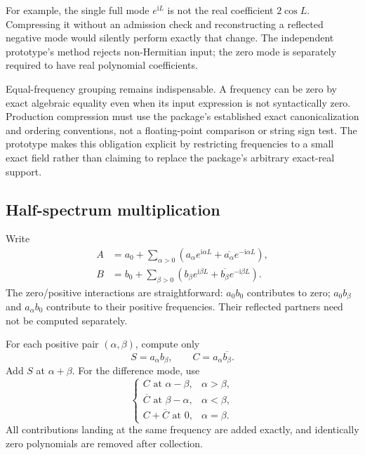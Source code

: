 \documentclass[11pt,letterpaper]{article}
\newcommand{\code}[1]{\texttt{\small\detokenize{#1}}}
\newcommand{\ii}{\mathrm i}
\begin{document}
For example, the single full mode \(e^{\ii L}\) is not the real coefficient \(2\cos L\). Compressing it without an admission check and reconstructing a reflected negative mode would silently perform exactly that change. The independent prototype's \code{from_full} method rejects non-Hermitian input; the zero mode is separately required to have real polynomial coefficients.

Equal-frequency grouping remains indispensable. A frequency can be zero by exact algebraic equality even when its input expression is not syntactically zero. Production compression must use the package's established exact canonicalization and ordering conventions, not a floating-point comparison or string sign test. The prototype makes this obligation explicit by restricting frequencies to a small exact field rather than claiming to replace the package's arbitrary exact-real support.

\subsection{Half-spectrum multiplication}
Write
\begin{align*}
 A &= a_0+\sum_{\alpha>0}
       \left(a_\alpha e^{\ii\alpha L}
       +\overline{a_\alpha}e^{-\ii\alpha L}\right),\\
 B &= b_0+\sum_{\beta>0}
       \left(b_\beta e^{\ii\beta L}
       +\overline{b_\beta}e^{-\ii\beta L}\right).
\end{align*}
The zero/positive interactions are straightforward: \(a_0b_0\) contributes to zero; \(a_0b_\beta\) and \(a_\alpha b_0\) contribute to their positive frequencies. Their reflected partners need not be computed separately.

For each positive pair \((\alpha,\beta)\), compute only
\begin{equation}\label{eq:twoproducts}
 S=a_\alpha b_\beta,\qquad
 C=a_\alpha\overline{b_\beta}.
\end{equation}
Add \(S\) at \(\alpha+\beta\). For the difference mode, use
\begin{equation}\label{eq:difference}
\begin{cases}
 C \text{ at } \alpha-\beta, & \alpha>\beta,\\
 \overline C \text{ at } \beta-\alpha, & \alpha<\beta,\\
 C+\overline C \text{ at }0, & \alpha=\beta.
\end{cases}
\end{equation}
All contributions landing at the same frequency are added exactly, and identically zero polynomials are removed after collection.
\end{document}
